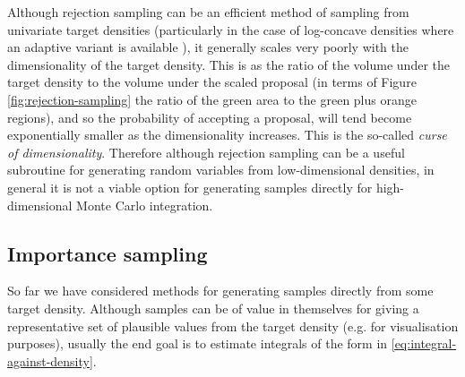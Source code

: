 Although rejection sampling can be an efficient method of sampling from univariate target densities (particularly in the case of log-concave densities where an adaptive variant is available \citep{gilks1992adaptive}), it generally scales very poorly with the dimensionality of the target density. This is as the ratio of the volume under the target density to the volume under the scaled proposal (in terms of Figure \ref{fig:rejection-sampling} the ratio of the green area to the green plus orange regions), and so the probability of accepting a proposal, will tend become exponentially smaller as the dimensionality increases. This is the so-called \emph{curse of dimensionality}. Therefore although rejection sampling can be a useful subroutine for generating random variables from low-dimensional densities, in general it is not a viable option for generating samples directly for high-dimensional Monte Carlo integration.

\subsection{Importance sampling}

So far we have considered methods for generating samples directly from some target density. Although samples can be of value in themselves for giving a representative set of plausible values from the target density (e.g. for visualisation purposes), usually the end goal is to estimate integrals of the form in \eqref{eq:integral-against-density}. 

